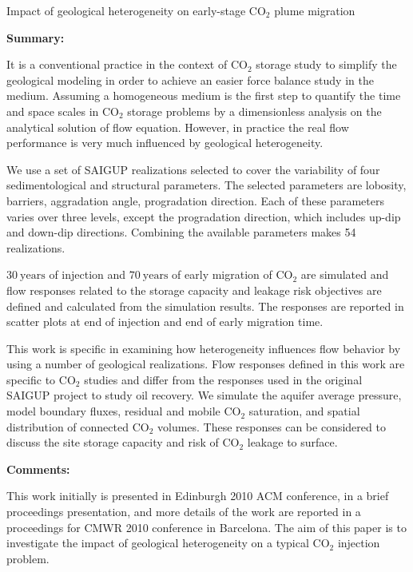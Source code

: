 %
%
{Impact of geological heterogeneity on early-stage $\mbox{CO}_2$ plume
migration}
{%
\textbf{Summary:}

It is a conventional practice in the context of $\mbox{CO}_2$ storage study to
simplify the geological modeling in order to achieve an easier force balance
study in the medium. Assuming a homogeneous medium is the first step to quantify
the time and space scales in $\mbox{CO}_2$ storage problems by a
dimensionless analysis on the analytical solution of flow equation. However, in
practice the real flow performance is very much influenced by geological
heterogeneity. 

We use a set of SAIGUP realizations selected to cover the variability of four
sedimentological and structural parameters. The selected parameters are
lobosity, barriers, aggradation angle, progradation direction. Each
of these parameters varies over three levels, except the progradation direction,
which includes up-dip and down-dip directions. Combining the available 
parameters makes 54 realizations.

$30~\mbox{years}$ of injection and $70~\mbox{years}$ of early migration of
$\mbox{CO}_2$ are simulated and flow responses related to the storage
capacity and leakage risk objectives are defined and calculated from
the simulation results. The responses are reported in scatter plots at end of
injection and end of early migration time. 

This work is specific in examining how heterogeneity influences flow behavior
by using a number of geological realizations. Flow responses defined in
this work are specific to $\mbox{CO}_2$ studies and differ from the responses
used in the original SAIGUP project to study oil recovery. We simulate the
aquifer average pressure,  model boundary fluxes, residual and mobile CO$_2$
saturation, and spatial distribution of connected CO$_2$ volumes. These
responses can be considered to discuss the site storage capacity and risk of
CO$_2$ leakage to surface. 

\vspace{0.5cm}
\noindent\textbf{Comments:}

This work initially is presented in Edinburgh 2010 ACM conference, in a
brief proceedings presentation, and more details of the work are reported in a
proceedings for CMWR 2010 conference in Barcelona. The aim of this paper is to
investigate the impact of geological heterogeneity on a typical $\mbox{CO}_2$
injection problem.

}
